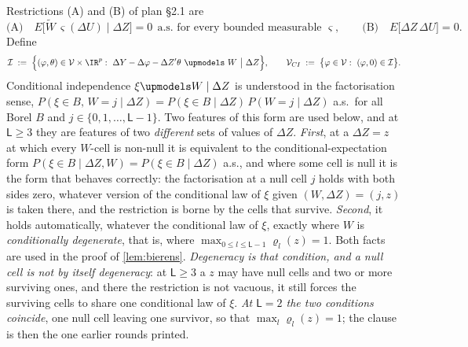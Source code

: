 
\begin{definition}\label{def:admissible}
Restrictions (A) and (B) of plan \S2.1 are
\[
\text{(A)}\quad E\big[\widetilde W\,\varsigma(\Delta U)\;\big|\;\Delta Z\big]=0\ \ \text{a.s. for every bounded measurable }\varsigma,
\qquad
\text{(B)}\quad E\big[\Delta Z\,\Delta U\big]=0 .
\]
Define
\[
\mathcal I\;:=\;\Big\{(\varphi,\theta)\in\mathcal V\times\IR^{p}:\ \Delta Y-\Delta\varphi-\Delta Z'\theta\ \upmodels\ W\ \big|\ \Delta Z\Big\},
\qquad
\mathcal V_{CI}\;:=\;\big\{\varphi\in\mathcal V:\ (\varphi,0)\in\mathcal I\big\}.
\]
Conditional independence $\xi\upmodels W\mid\Delta Z$ is understood in the factorisation sense,
$P(\xi\in B,\,W=j\mid\Delta Z)=P(\xi\in B\mid\Delta Z)\,P(W=j\mid\Delta Z)$ a.s.\ for all Borel $B$ and
$j\in\{0,1,\dots,\mathsf L-1\}$. Two features of this form are used below, and at $\mathsf L\ge3$ they
are features of two \emph{different} sets of values of $\Delta Z$.
\emph{First}, at a $\Delta Z=z$ at which every $W$-cell is non-null it is equivalent to the
conditional-expectation form $P(\xi\in B\mid\Delta Z,W)=P(\xi\in B\mid\Delta Z)$ a.s., and where some cell is null it is the form that behaves correctly: the
factorisation at a null cell $j$ holds with both sides zero, whatever version of the conditional law of
$\xi$ given $(W,\Delta Z)=(j,z)$ is taken there, and the restriction is borne by the cells that survive.
\emph{Second}, it holds automatically, whatever the conditional law of $\xi$, exactly where $W$ is
\emph{conditionally degenerate}, that is, where $\max_{0\le l\le\mathsf L-1}\varrho_l(z)=1$. Both facts
are used in the proof of \cref{lem:bierens}.
\emph{Degeneracy is that condition, and a null cell is not by itself degeneracy}: at $\mathsf L\ge3$ a
$z$ may have null cells and two or more surviving ones, and there the restriction is not vacuous, it
still forces the surviving cells to share one conditional law of $\xi$. \emph{At $\mathsf L=2$ the two
conditions coincide}, one null cell leaving one survivor, so that
$\max_{l}\varrho_l(z)=1$; the clause is then the one earlier rounds printed.
\end{definition}


